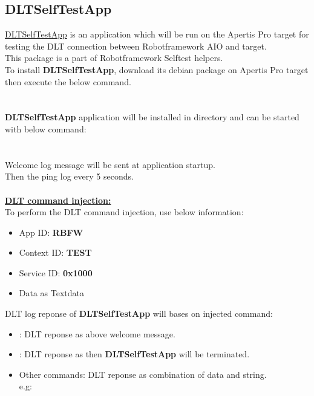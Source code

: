 \subsection{DLTSelfTestApp}
\href{https://sourcecode.socialcoding.bosch.com/projects/ROBFW/repos/selftest/browse/helpers/DLT}
{DLTSelfTestApp} is an application which will be run on the Apertis Pro target for 
testing the DLT connection between Robotframework AIO and target.\\
This package is a part of Robotframework Selftest helpers.\\
To install \textbf{DLTSelfTestApp}, download its debian package on Apertis Pro
target then execute the below command.\\
\\
\\
\textbf{DLTSelfTestApp} application will be installed in 
 directory and can be started with below command:\\
\\
\\
Welcome log message  
will be sent at application startup.\\
Then the ping log  
every 5 seconds.\\
\\
\textbf{\underline{DLT command injection:}}\\
To perform the DLT command injection, use below information:
\begin{itemize}
   \item App ID: \textbf{RBFW}
   \item Context ID: \textbf{TEST}
   \item Service ID: \textbf{0x1000}
   \item Data as Textdata
\end{itemize}

DLT log reponse of \textbf{DLTSelfTestApp} will bases on injected command:
\begin{itemize}
   \item {}: DLT reponse as above welcome message.
   \item {}: DLT reponse as  then \textbf{DLTSelfTestApp} 
                       will be terminated.
   \item Other commands: DLT reponse as combination of data and string.\\
   e.g: 
\end{itemize}

